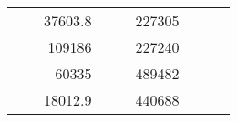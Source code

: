 \begin{table}[]
\begin{tabular}{|ccrccrccc}
\multicolumn{1}{|c|}{\cellcolor[HTML]{FFFFC7}}                                & \multicolumn{1}{c|}{\cellcolor[HTML]{DAE8FC}}                      & \multicolumn{1}{r|}{\cellcolor[HTML]{DAE8FC}37603.8}   & \multicolumn{1}{c|}{\cellcolor[HTML]{FFFFC7}}                                & \multicolumn{1}{c|}{\cellcolor[HTML]{DAE8FC}}                       & \multicolumn{1}{r|}{\cellcolor[HTML]{DDFDFF}227305}    &                                                                              &                                                                    &                                                        \\ \cline{3-3} \cline{6-6}
\multicolumn{1}{|c|}{\cellcolor[HTML]{FFFFC7}}                                & \multicolumn{1}{c|}{\cellcolor[HTML]{DAE8FC}}                      & \multicolumn{1}{r|}{\cellcolor[HTML]{DDFDFF}109186}    & \multicolumn{1}{c|}{\cellcolor[HTML]{FFFFC7}}                                & \multicolumn{1}{c|}{\cellcolor[HTML]{DAE8FC}}                       & \multicolumn{1}{r|}{\cellcolor[HTML]{DAE8FC}227240}    &                                                                              &                                                                    &                                                        \\ \cline{3-3} \cline{6-6}
\multicolumn{1}{|c|}{\cellcolor[HTML]{FFFFC7}}                                & \multicolumn{1}{c|}{\cellcolor[HTML]{DAE8FC}}                      & \multicolumn{1}{r|}{\cellcolor[HTML]{DAE8FC}60335}     & \multicolumn{1}{c|}{\cellcolor[HTML]{FFFFC7}}                                & \multicolumn{1}{c|}{\cellcolor[HTML]{DAE8FC}}                       & \multicolumn{1}{r|}{\cellcolor[HTML]{DDFDFF}489482}    &                                                                              &                                                                    &                                                        \\ \cline{3-3} \cline{6-6}
\multicolumn{1}{|c|}{\cellcolor[HTML]{FFFFC7}}                                & \multicolumn{1}{c|}{\cellcolor[HTML]{DAE8FC}}                      & \multicolumn{1}{r|}{\cellcolor[HTML]{DDFDFF}18012.9}   & \multicolumn{1}{c|}{\cellcolor[HTML]{FFFFC7}}                                & \multicolumn{1}{c|}{\cellcolor[HTML]{DAE8FC}}                       & \multicolumn{1}{r|}{\cellcolor[HTML]{DAE8FC}440688}    &                                                                              &                                                                    &                                                        \\ \cline{3-3} \cline{6-6}

\end{tabular}
\end{table}
